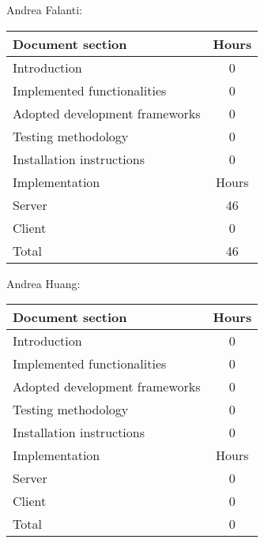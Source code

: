 Andrea Falanti:

\begin{tabular}{|l|c|}
    \hline
    Document section & Hours\\
    \hline
     Introduction & 0\\
     Implemented functionalities & 0\\
     Adopted development frameworks & 0\\
     Testing methodology & 0\\
     Installation instructions & 0\\
     \hline
     Implementation & Hours \\
     \hline
     Server & 46\\
     Client & 0\\
     \hline
     Total & 46\\
     \hline
\end{tabular}

\vskip 0.3in

Andrea Huang:

\begin{tabular}{|l|c|}
    \hline
    Document section & Hours \\
    \hline
     Introduction & 0\\
     Implemented functionalities & 0\\
     Adopted development frameworks & 0\\
     Testing methodology & 0\\
     Installation instructions & 0\\
     \hline
     Implementation & Hours \\
     \hline
     Server & 0\\
     Client & 0\\
     \hline
     Total & 0\\
     \hline
\end{tabular}